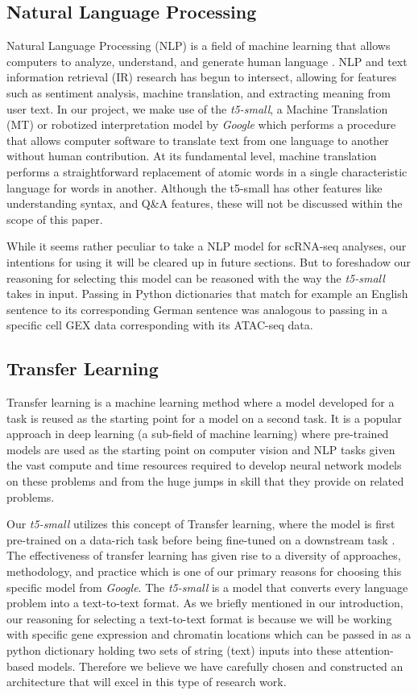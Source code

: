 \subsection{Natural Language Processing}

Natural Language Processing (NLP) is a field of machine learning that allows computers to analyze, understand, and generate human language \cite{three}. 
NLP and text information retrieval (IR) research has begun to intersect, allowing for features such as sentiment analysis, machine translation, and extracting meaning from user text. 
In our project, we make use of the \emph{t5-small}, a Machine Translation (MT) or robotized interpretation model by \emph{Google} which performs a procedure that allows computer software to translate text from one language to another without human contribution. 
At its fundamental level, machine translation performs a straightforward replacement of atomic words in a single characteristic language for words in another. 
Although the t5-small has other features like understanding syntax, and Q\&A features, these will not be discussed within the scope of this paper.

While it seems rather peculiar to take a NLP model for scRNA-seq analyses, our intentions for using it will be cleared up in future sections. But to foreshadow our reasoning for selecting this model can be reasoned with the way the \emph{t5-small} takes in input. Passing in Python dictionaries that match for example an English sentence to its corresponding German sentence was analogous to passing in a specific cell GEX data corresponding with its ATAC-seq data. 

\subsection{Transfer Learning}
Transfer learning is a machine learning method where a model developed for a task is reused as the starting point for a model on a second task. 
It is a popular approach in deep learning (a sub-field of machine learning) where pre-trained models are used as the starting point on computer vision and NLP tasks given the vast compute and time resources required to develop neural network models on these problems and from the huge jumps in skill that they provide on related problems. 

Our \emph{t5-small} utilizes this concept of Transfer learning, where the model is first pre-trained on a data-rich task before being fine-tuned on a downstream task \cite{four}. 
The effectiveness of transfer learning has given rise to a diversity of approaches, methodology, and practice which is one of our primary reasons for choosing this specific model from \emph{Google}. 
The \emph{t5-small} is a model that converts every language problem into a text-to-text format. 
As we briefly mentioned in our introduction, our reasoning for selecting a text-to-text format is because we will be working with specific gene expression and chromatin locations which can be passed in as a python dictionary holding two sets of string (text) inputs into these attention-based models. 
Therefore we believe we have carefully chosen and constructed an architecture that will excel in this type of research work. 

